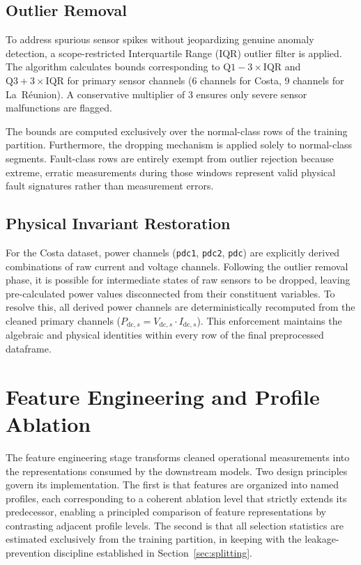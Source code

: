 \subsection{Outlier Removal}
To address spurious sensor spikes without jeopardizing genuine anomaly detection, a scope-restricted Interquartile Range (IQR) outlier filter is applied. 
The algorithm calculates bounds corresponding to $\text{Q}1 - 3 \times \text{IQR}$ and $\text{Q}3 + 3 \times \text{IQR}$ for primary sensor channels (6 channels for Costa, 9 channels for La~Réunion). A conservative multiplier of 3 ensures only severe sensor malfunctions are flagged.

The bounds are computed exclusively over the normal-class rows of the training partition. Furthermore, the dropping mechanism is applied solely to normal-class segments. Fault-class rows are entirely exempt from outlier rejection because extreme, erratic measurements during those windows represent valid physical fault signatures rather than measurement errors. 

\subsection{Physical Invariant Restoration}
For the Costa dataset, power channels (\texttt{pdc1}, \texttt{pdc2}, \texttt{pdc}) are explicitly derived combinations of raw current and voltage channels. Following the outlier removal phase, it is possible for intermediate states of raw sensors to be dropped, leaving pre-calculated power values disconnected from their constituent variables. To resolve this, all derived power channels are deterministically recomputed from the cleaned primary channels ($P_{\mathrm{dc},s} = V_{\mathrm{dc},s} \cdot I_{\mathrm{dc},s}$). This enforcement maintains the algebraic and physical identities within every row of the final preprocessed dataframe.


\section{Feature Engineering and Profile Ablation}
\label{sec:feature-engineering}

The feature engineering stage transforms cleaned operational measurements into the representations consumed by the downstream models. Two design principles govern its implementation. The first is that features are organized into named profiles, each corresponding to a coherent ablation level that strictly extends its predecessor, enabling a principled comparison of feature representations by contrasting adjacent profile levels. The second is that all selection statistics are estimated exclusively from the training partition, in keeping with the leakage-prevention discipline established in Section~\ref{sec:splitting}.

